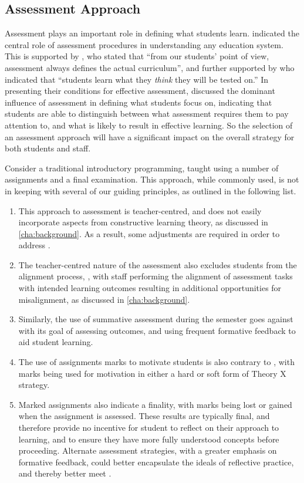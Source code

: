 \subsection{Assessment Approach} %
\label{sub:assessment_approach}

Assessment plays an important role in defining what students learn. \citet{Rowntree:1977} indicated the central role of assessment procedures in understanding any education system. This is supported by \citet{Ramsden:2003}, who stated that ``from our students' point of view, assessment always defines the actual curriculum'', and further supported by \citet{Biggs:2007} who indicated that ``students learn what they \emph{think} they will be tested on.'' In presenting their conditions for effective assessment, \citet{Gibbs:2004} discussed the dominant influence of assessment in defining what students focus on, indicating that students are able to distinguish between what assessment requires them to pay attention to, and what is likely to result in effective learning. So the selection of an assessment approach will have a significant impact on the overall strategy for both students and staff. 

Consider a traditional introductory programming, taught using a number of assignments and a final examination. This approach, while commonly used, is not in keeping with several of our guiding principles, as outlined in the following list. 

\begin{enumerate}
	\item This approach to assessment is teacher-centred, and does not easily incorporate aspects from constructive learning theory, as discussed in \cref{cha:background}.  As a result, some adjustments are required in order to address .
	\item The teacher-centred nature of the assessment also excludes students from the alignment process, , with staff performing the alignment of assessment tasks with intended learning outcomes resulting in additional opportunities for misalignment, as discussed in \cref{cha:background}. 
	\item Similarly, the use of summative assessment during the semester goes against  with its goal of assessing outcomes, and using frequent formative feedback to aid student learning.
	\item The use of assignments marks to motivate students is also contrary to , with marks being used for motivation in either a hard or soft form of Theory X strategy.
	\item Marked assignments also indicate a finality, with marks being lost or gained when the assignment is assessed. These results are typically final, and therefore provide no incentive for student to reflect on their approach to learning, and to ensure they have more fully understood concepts before proceeding. Alternate assessment strategies, with a greater emphasis on formative feedback, could better encapsulate the ideals of reflective practice, and thereby better meet .
\end{enumerate}

